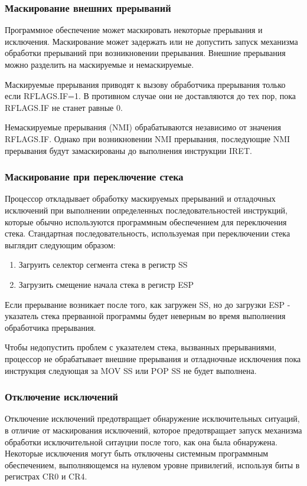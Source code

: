 \subsubsection*{Маскирование внешних прерываний}
Программное обеспечение может маскировать некоторые прерывания и исключения.
Маскирование может задержать или не допустить запуск механизма обработки
прерываний при возникновении прерывания. Внешние прерывания можно разделить на
маскируемые и немаскируемые.

Маскируемые прерывания приводят к вызову обработчика прерывания только если
RFLAGS.IF=1. В противном случае они не доставляются до тех пор, пока RFLAGS.IF
не станет равные 0.

Немаскируемые прерывания (NMI) обрабатываются независимо от значения RFLAGS.IF.
Однако при возникновении NMI прерывания, последующие NMI прерывания будут
замаскированы до выполнения инструкции IRET.

\subsubsection*{Маскирование при переключение стека}
Процессор откладывает обработку маскируемых прерываний и отладочных исключений
при выполнении определенных последовательностей инструкций, которые обычно
используются программным обеспечением для переключения стека. Стандартная
последовательность, используемая при переключении стека выглядит следующим
образом:
\begin{enumerate}
\item Загруить селектор сегмента стека в регистр SS
\item Загрузить смещение начала стека в регистр ESP
\end{enumerate}

Если прерывание возникает после того, как загружен SS, но до загрузки ESP -
указатель стека прерванной программы будет неверным во время выполнения
обработчика прерывания.

Чтобы недопустить проблем с указателем стека, вызванных прерываниями,
процессор не обрабатывает внешние прерывания и отладночные исключения пока
инструкция следующая за MOV SS или POP SS не будет выполнена.

\subsubsection*{Отключение исключений}
Отключение исключений предотвращает обнаружение исключительных ситуаций, в
отличие от маскирования исключений, которое предотвращает запуск механизма
обработки исключительной ситауции после того, как она была обнаружена.
Некоторые исключения могут быть отключены системным программным обеспечением,
выполняющемся на нулевом уровне привилегий, используя биты в регистрах CR0 и
CR4.

